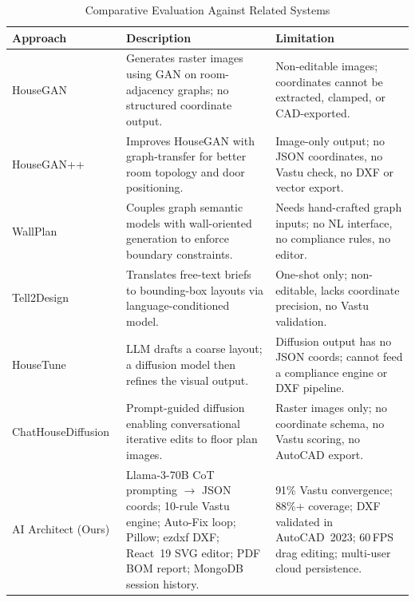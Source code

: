 \documentclass[10pt, twocolumn, letterpaper]{article}
\begin{document}
\begin{table}[!ht]
\caption{Comparative Evaluation Against Related Systems}
\label{tab:results}
\centering
\fontsize{8}{10}\selectfont
\renewcommand{\arraystretch}{1.4}
\begin{tabular}{@{}p{0.85in}p{1.1in}p{1.1in}@{}}
\toprule
\textbf{Approach} & \textbf{Description} & \textbf{Limitation} \\
\midrule

HouseGAN~\cite{houseGAN}
&
Generates raster images using GAN on room-adjacency graphs; no structured coordinate output.
&
Non-editable images; coordinates cannot be extracted, clamped, or CAD-exported. \\[4pt]

HouseGAN++~\cite{houseGANpp}
&
Improves HouseGAN with graph-transfer for better room topology and door positioning.
&
Image-only output; no JSON coordinates, no Vastu check, no DXF or vector export. \\[4pt]

WallPlan~\cite{wallplan}
&
Couples graph semantic models with wall-oriented generation to enforce boundary constraints.
&
Needs hand-crafted graph inputs; no NL interface, no compliance rules, no editor. \\[4pt]

Tell2Design~\cite{tell2design}
&
Translates free-text briefs to bounding-box layouts via language-conditioned model.
&
One-shot only; non-editable, lacks coordinate precision, no Vastu validation. \\[4pt]

HouseTune~\cite{housetune}
&
LLM drafts a coarse layout; a diffusion model then refines the visual output.
&
Diffusion output has no JSON coords; cannot feed a compliance engine or DXF pipeline. \\[4pt]

ChatHouseDiffusion~\cite{chathousediffusion}
&
Prompt-guided diffusion enabling conversational iterative edits to floor plan images.
&
Raster images only; no coordinate schema, no Vastu scoring, no AutoCAD export. \\[4pt]

AI Architect (Ours)
&
Llama-3-70B CoT prompting $\rightarrow$ JSON coords; 10-rule Vastu engine; Auto-Fix loop; Pillow; ezdxf DXF; React~19 SVG editor; PDF BOM report; MongoDB session history.
&
91\% Vastu convergence; 88\%+ coverage; DXF validated in AutoCAD~2023; 60\,FPS drag editing; multi-user cloud persistence. \\

\bottomrule
\end{tabular}
\end{table}
\end{document}
